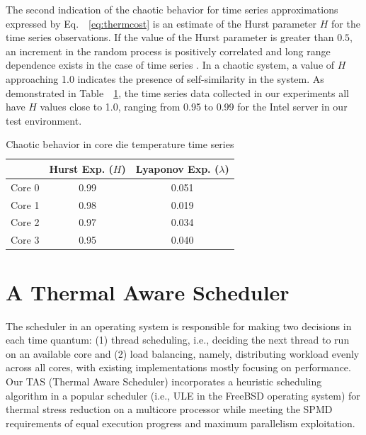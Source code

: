 \documentclass[times, 10pt,twocolumn]{IEEEtran}
\newcommand{\equationnames}{Eq.\ }
\begin{document}
The second indication of the chaotic behavior for time series
approximations expressed by \equationnames~\eqref{eq:thermcost} 
is an estimate of the Hurst parameter $H$ for the
time series observations. If the value of the Hurst
parameter is greater than $0.5$, an increment in the random process is
positively correlated and long range dependence exists in the case of
time series \cite{Sprott2003}.  In a chaotic system, a value of $H$ approaching 1.0
indicates the presence of self-similarity in the system.  As
demonstrated in Table~~\ref{tab:chaotic}, the time series data collected
in our experiments all have $H$ values close to 1.0, ranging from
0.95 to 0.99 for the Intel server in our test environment.

\begin{table}[tbhp]
  \caption{Chaotic behavior in core die temperature time series}
  \label{tab:chaotic} 
   \centering 
\begin{tabular}{lcc}
\hline
 & Hurst Exp. ($H$) & Lyaponov Exp. ($\lambda$) \\
\hline
Core 0 & 0.99 & 0.051 \\
Core 1 & 0.98 & 0.019 \\
Core 2 & 0.97 & 0.034 \\
Core 3 & 0.95 & 0.040 \\
\hline
\end{tabular}

\end{table}

\section{A Thermal Aware Scheduler}
\label{sec:sdesign} 
The scheduler in an operating system is responsible
for making two decisions in each time quantum: (1) thread scheduling,
i.e., deciding the next thread to run on an available core and (2) load
balancing, namely, distributing workload evenly across all cores, with
existing implementations mostly focusing on performance.  
Our TAS (Thermal Aware Scheduler) incorporates a heuristic scheduling algorithm
in a popular scheduler
(i.e., ULE in the FreeBSD operating system) for thermal stress reduction
on a multicore processor while meeting the SPMD requirements of
equal execution progress and maximum parallelism exploitation.
\end{document}
